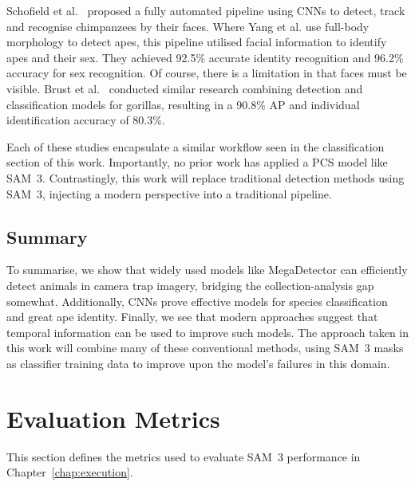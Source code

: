 \documentclass[author={Jacob Stephenson},
    degree={BSc},
    title={Robust Great Ape Species Detection in Wild Camera Trap Imagery with Promptable Concept Segmentation},
    unit={COMS30045},
    subtitle={}]{dissertation}
\begin{document}
Schofield et al.~\cite{schofield2019chimpanzee} proposed a fully automated pipeline using CNNs to detect, track and recognise chimpanzees by their faces. Where Yang et al. use full-body morphology to detect apes, this pipeline utilised facial information to identify apes and their sex. They achieved 92.5\% accurate identity recognition and 96.2\% accuracy for sex recognition. Of course, there is a limitation in that faces must be visible. Brust et al.~\cite{brust2017gorilla} conducted similar research combining detection and classification models for gorillas, resulting in a 90.8\% AP and individual identification accuracy of 80.3\%.

Each of these studies encapsulate a similar workflow seen in the classification section of this work. Importantly, no prior work has applied a PCS model like SAM~3. Contrastingly, this work will replace traditional detection methods using SAM~3, injecting a modern perspective into a traditional pipeline.

\subsection{Summary}

To summarise, we show that widely used models like MegaDetector can efficiently detect animals in camera trap imagery, bridging the collection-analysis gap somewhat. Additionally, CNNs prove effective models for species classification and great ape identity. Finally, we see that modern approaches suggest that temporal information can be used to improve such models. The approach taken in this work will combine many of these conventional methods, using SAM~3 masks as classifier training data to improve upon the model's failures in this domain.









\section{Evaluation Metrics}


This section defines the metrics used to evaluate SAM~3 performance in Chapter~\ref{chap:execution}.
\end{document}
